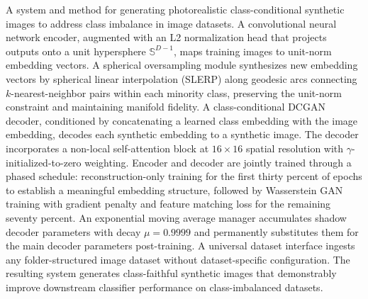 \documentclass[12pt,letterpaper]{article}
\begin{document}
A system and method for generating photorealistic class-conditional synthetic
images to address class imbalance in image datasets. A convolutional neural
network encoder, augmented with an L2 normalization head that projects outputs
onto a unit hypersphere $\mathbb{S}^{D-1}$, maps training images to unit-norm
embedding vectors. A spherical oversampling module synthesizes new embedding
vectors by spherical linear interpolation (SLERP) along geodesic arcs
connecting $k$-nearest-neighbor pairs within each minority class, preserving
the unit-norm constraint and maintaining manifold fidelity. A class-conditional
DCGAN decoder, conditioned by concatenating a learned class embedding with the
image embedding, decodes each synthetic embedding to a synthetic image. The
decoder incorporates a non-local self-attention block at $16\times16$ spatial
resolution with $\gamma$-initialized-to-zero weighting. Encoder and decoder are
jointly trained through a phased schedule: reconstruction-only training for
the first thirty percent of epochs to establish a meaningful embedding
structure, followed by Wasserstein GAN training with gradient penalty and
feature matching loss for the remaining seventy percent. An exponential moving
average manager accumulates shadow decoder parameters with decay $\mu = 0.9999$
and permanently substitutes them for the main decoder parameters post-training.
A universal dataset interface ingests any folder-structured image dataset
without dataset-specific configuration. The resulting system generates
class-faithful synthetic images that demonstrably improve downstream classifier
performance on class-imbalanced datasets.
\end{document}

